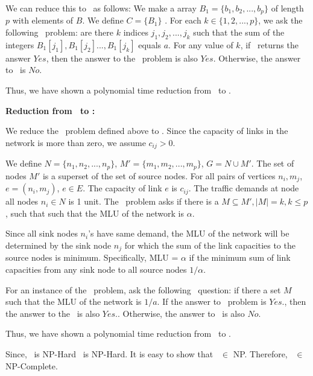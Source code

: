 We can reduce this to \minsubsetsum\ as follows: We make a array $B_1 = \{b_1, b_2, ..., b_p\}$ of length $p$ with elements of $B$. We define $C = \{ B_1 \}$ . For each $k \in \{1, 2, ..., p\}$, we ask the following \minsubsetsum\ problem: are there $k$ indices $j_1, j_2, ..., j_k$ such that the sum of the integers $B_1[j_1], B_1[j_2] ..., B_1[j_k]$ equals $a$. For any value of $k$, if \minsubsetsum\ returns the answer $\textit{Yes}$, then the answer to the \subsetsum\ problem is also $\textit{Yes}$. Otherwise, the answer to \subsetsum\ is $\textit{No}$.

Thus, we have shown a polynomial time reduction from \subsetsum\ to \minsubsetsum.

\noindent\textbf{Reduction from \minsubsetsum\ to \optloc:} 


We reduce the \minsubsetsum\ problem defined above to \optloc.  Since the capacity of links in the network is more than zero, we assume $c_{ij} > 0$. %

We define $N = \{n_1, n_2, ..., n_p\}$, $M' = \{m_1, m_2, ..., m_p\}$, $ G = N \cup M'.$ The set of nodes $M'$ is a superset of the set of source nodes. For all pairs of vertices $n_i, m_j$, $e = (n_i, m_j)$, $e \in E$. The capacity of link $e$ is $c_{ij}$.  The traffic demands at node all nodes $n_i \in N$ is 1 unit. The \optloc\ problem asks if there is a $ M \subseteq M', |M| = k, k \leq p$, such that  such that the MLU of the network is $\alpha$.



Since all sink nodes $n_i$'s have same demand, the MLU of the network will be determined by the sink node $n_j$ for which the sum of the link capacities to the source nodes is minimum. Specifically, MLU = $\alpha$ if the minimum sum of link capacities from any sink node to all source nodes $1/\alpha$. 

For an instance of the \minsubsetsum\ problem, ask the following \optloc\ question: if there a set $M$ such that the MLU of the network is $1/a$. If the answer to \optloc\ problem is $\textit{Yes}$., then the answer to the \minsubsetsum\ is also $\textit{Yes}$.. Otherwise, the answer to \minsubsetsum\ is also $\textit{No}$.

Thus, we have shown a polynomial time reduction from \minsubsetsum\ to \optloc.

Since, \subsetsum\ is NP-Hard \optloc\ is NP-Hard. It is easy to show that \optloc\ $\in$ NP. Therefore, \optloc\ $\in$ NP-Complete.
